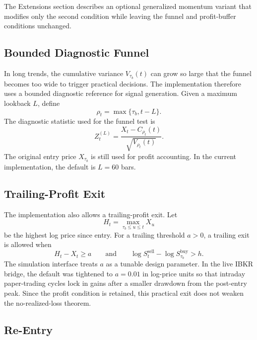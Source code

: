 \documentclass[11pt]{article}
\begin{document}
The Extensions section describes an optional generalized momentum variant that modifies only the second condition while leaving the funnel and profit-buffer conditions unchanged.

\subsection{Bounded Diagnostic Funnel}

In long trends, the cumulative variance \(V_{\tau_b}(t)\) can grow so large that the funnel becomes too wide to trigger practical decisions. The implementation therefore uses a bounded diagnostic reference for signal generation. Given a maximum lookback \(L\), define
\[
\rho_t=\max\{\tau_b,t-L\}.
\]
The diagnostic statistic used for the funnel test is
\[
Z^{(L)}_t
=
\frac{X_t-C_{\rho_t}(t)}
{\sqrt{V_{\rho_t}(t)}}.
\]
The original entry price \(X_{\tau_b}\) is still used for profit accounting. In the current implementation, the default is \(L=60\) bars.

\subsection{Trailing-Profit Exit}

The implementation also allows a trailing-profit exit. Let
\[
H_t=\max_{\tau_b\leq u\leq t}X_u
\]
be the highest log price since entry. For a trailing threshold \(a>0\), a trailing exit is allowed when
\[
H_t-X_t\geq a
\qquad\text{and}\qquad
\log S_t^{\mathrm{sell}}-\log S_{\tau_b}^{\mathrm{buy}}>h.
\]
The simulation interface treats \(a\) as a tunable design parameter. In the live IBKR bridge, the default was tightened to \(a=0.01\) in log-price units so that intraday paper-trading cycles lock in gains after a smaller drawdown from the post-entry peak. Since the profit condition is retained, this practical exit does not weaken the no-realized-loss theorem.

\subsection{Re-Entry}
\end{document}
